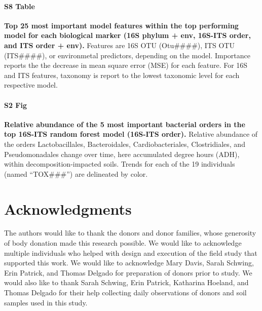 \documentclass[
  10pt,
  letterpaper,
]{article}
\begin{document}
\paragraph*{S8 Table}
\label{top-feat-table}
{\textbf{Top 25 most important model features within the top performing
model for each biological marker (16S phylum + env, 16S-ITS order, and
ITS order + env).}} Features are 16S OTU (Otu\#\#\#\#), ITS OTU
(ITS\#\#\#\#), or environmetal predictors, depending on the model.
Importance reports the the decrease in mean square error (MSE) for each
feature. For 16S and ITS features, taxonomy is report to the lowest
taxonomic level for each respective model.

\paragraph*{S2 Fig}
\label{s2-fig}
{\textbf{Relative abundance of the 5 most important bacterial orders in
the top 16S-ITS random forest model (16S-ITS order).}} Relative
abundance of the orders Lactobacillales, Bacteroidales,
Cardiobacteriales, Clostridiales, and Pseudomonadales change over time,
here accumulated degree hours (ADH), within decomposition-impacted
soils. Trends for each of the 19 individuals (named ``TOX\#\#\#'') are
delineated by color.

\section{Acknowledgments}\label{acknowledgments}

The authors would like to thank the donors and donor families, whose
generosity of body donation made this research possible. We would like
to acknowledge multiple individuals who helped with design and execution
of the field study that supported this work. We would like to
acknowledge Mary Davis, Sarah Schwing, Erin Patrick, and Thomas Delgado
for preparation of donors prior to study. We would also like to thank
Sarah Schwing, Erin Patrick, Katharina Hoeland, and Thomas Delgado for
their help collecting daily observations of donors and soil samples used
in this study.


\nolinenumbers
  
\end{document}
